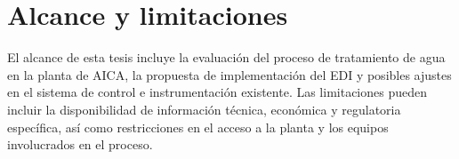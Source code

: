 \section*{Alcance y limitaciones}
El alcance de esta tesis incluye la evaluación del proceso de tratamiento de agua en la planta de AICA, la propuesta de implementación del EDI y posibles ajustes en el sistema de control e instrumentación existente. Las limitaciones pueden incluir la disponibilidad de información técnica, económica y regulatoria específica, así como restricciones en el acceso a la planta y los equipos involucrados en el proceso.